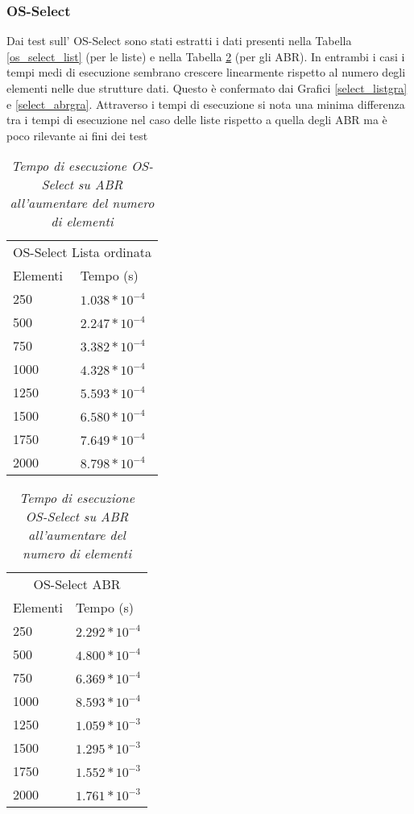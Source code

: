 \documentclass{article}
\begin{document}
\subsubsection{OS-Select}
Dai test sull’ OS-Select sono stati estratti i dati presenti nella Tabella \ref{os_select_list} (per le liste) e nella Tabella \ref{os_select_ABR} (per gli ABR). In entrambi i casi i tempi medi di esecuzione sembrano crescere linearmente rispetto al numero degli elementi nelle due strutture dati. Questo è confermato dai Grafici \ref{select_listgra} e \ref{select_abrgra}.
Attraverso i tempi di esecuzione si nota una minima differenza tra i tempi di esecuzione nel caso delle liste rispetto a quella degli ABR ma è poco rilevante ai fini dei test
\begin{table}[H]
    \begin{minipage}{.5\linewidth}
    \centering
    \begin{tabular}{l | l}
    \multicolumn{2}{c}{OS-Select Lista ordinata} \\[0.5ex]
    Elementi & Tempo (s)\\ [0.5ex]
    \hline \hline
    250 & $1.038*10^{-4}$ \\
    500 & $2.247*10^{-4}$ \\
    750 & $3.382*10^{-4}$ \\
    1000 & $4.328*10^{-4}$ \\
    1250 & $5.593*10^{-4}$ \\
    1500 & $6.580*10^{-4}$ \\
    1750 & $7.649*10^{-4}$ \\
    2000 & $8.798*10^{-4}$ \\
\end{tabular}
      \caption{\textit{Tempo di esecuzione OS-Select su lista ordinata all'aumentare del numero di elementi}}
      \label{os_select_list}
    \end{minipage}%
    \hspace{10pt}
    \begin{minipage}{.5\linewidth}
      \centering
        \begin{tabular}{l | l}
        \multicolumn{2}{c}{OS-Select ABR} \\[0.5ex]
    Elementi & Tempo (s)\\ [0.5ex]
    \hline \hline
    250 & $2.292*10^{-4}$  \\
    500 & $4.800*10^{-4}$  \\
    750 & $6.369*10^{-4}$  \\
    1000 & $8.593*10^{-4}$  \\
    1250 & $1.059*10^{-3}$  \\
    1500 & $1.295*10^{-3}$ \\
    1750 & $1.552*10^{-3}$ \\
    2000 & $1.761*10^{-3}$ \\
\end{tabular}
        \caption{\textit{Tempo di esecuzione OS-Select su ABR all'aumentare del numero di elementi}}
        \label{os_select_ABR}
    \end{minipage} 
\end{table}
\end{document}
